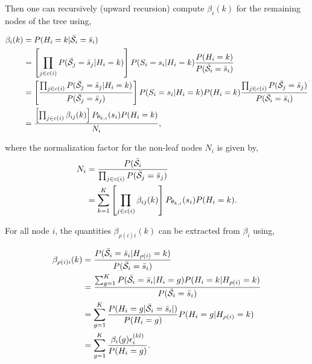 \documentclass[a4paper,11pt]{report}
\begin{document}
				Then one can recursively (upward recursion) compute $\beta_{i}(k)$ for the remaining nodes of the tree using,
				
				\begin{equation}
					\begin{split}
						\beta_{i}(k)	&= P(H_{i}=k | \bar{\mathcal{S}}_{i}= \bar{s}_{i})\\
													&= \left[ \prod_{j \in c(i)} P(\bar{\mathcal{S}}_{j}= \bar{s}_{j} | H_{i}=k) \right] P(S_{i}= s_{i} | H_{i}=k) \frac{P(H_{i}=k)} {P(\bar{\mathcal{S}}_{i}= \bar{s}_{i})}\\
													&= \left[ \frac{\prod_{j \in c(i)} P(\bar{\mathcal{S}}_{j}= \bar{s}_{j} | H_{i}=k)} {P(\bar{\mathcal{S}}_{j}= \bar{s}_{j})} \right]
														P(S_{i}= s_{i} | H_{i}=k) P(H_{i}=k) 
														\frac{\prod_{j \in c(i)} P(\bar{\mathcal{S}}_{j}= \bar{s}_{j})} {P(\bar{\mathcal{S}}_{i}= \bar{s}_{i})}\\
													&= \frac{ \left[ \prod_{j \in c(i)} \beta_{ij}(k) \right] P_{\theta_{k,i}}(s_{i})P(H_{i}=k)}{N_{i}},
						\end{split}
						\label{eq:upward beta node}
				\end{equation}
				
				where the normalization factor for the non-leaf nodes $N_{i}$ is given by,
				\begin{equation}
					\begin{split}
						N_{i}	&= \frac{P(\bar{\mathcal{S}}_{i}}{\prod_{j \in c(i)} P(\bar{\mathcal{S}}_{j}= \bar{s}_{j})}\\
									&= \sum_{k=1}^{K} \left[ \prod_{j \in c(i)} \beta_{ij}(k) \right]  P_{\theta_{k,i}}(s_{i})P(H_{i}=k).
					\end{split}
					\label{eq:upward normalization others}
				\end{equation}

				For all node $i$, the quantities $\beta_{\rho(i)i}(k)$ can be extracted from $\beta_{i}$ using,
				
				\begin{equation}
					\begin{split}
						\beta_{\rho(i)i}(k)	&= \frac{P(\bar{\mathcal{S}}_{i}= \bar{s}_{i} | H_{\rho(i)}=k)} {P(\bar{\mathcal{S}}_{i}= \bar{s}_{i}) }\\
																&= \frac{ \sum_{g=1}^{K} P(\bar{\mathcal{S}}_{i}= \bar{s}_{i} | H_{i}=g) P(H_{i}= k | H_{\rho(i)}=k)} {P(\bar{\mathcal{S}}_{i}= \bar{s}_{i}) }\\
																&= \sum_{g=1}^{K} \frac{ P(H_{i}=g | \bar{\mathcal{S}}_{i}= \bar{s}_{i} |)}{P(H_{i}=g)} P(H_{i}= g | H_{\rho(i)}=k)\\
																&= \sum_{g=1}^{K} \frac{\beta_{i}(g) \epsilon_{i}^{(kl)}}{P(H_{i}=g)}.
						\end{split}
						\label{eq:upward beta node and parents}
				\end{equation}
				
\end{document}
